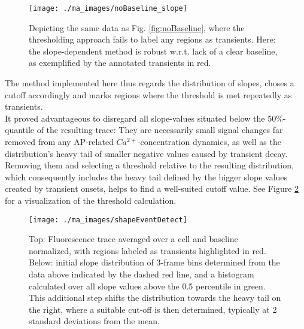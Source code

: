 \documentclass[titlepage]{article}
\begin{document}
\begin{figure}[h]
\centering
\texttt{[image: ./ma\_images/noBaseline\_slope]}
\caption{Depicting the same data as Fig. \ref{fig:noBaseline}, where the thresholding approach fails to label any regions as transients. Here: the slope-dependent method is robust w.r.t. lack of a clear baseline, as exemplified by the annotated transients in red.}
\label{fig:noBaseline_slope}
\end{figure}
The method implemented here thus regards the distribution of slopes, choses a cutoff accordingly and marks regions where the threshold is met repeatedly as transients.\\
It proved advantageous to disregard all slope-values situated below the 50\%-quantile of the resulting trace: They are necessarily small signal changes far removed from any AP-related $Ca^{2+}$-concentration dynamics, as well as the distribution's heavy tail of smaller negative values caused by transient decay.\\
Removing them and selecting a threshold relative to the resulting distribution, which consequently includes the heavy tail defined by the bigger slope values created by transient onsets, helps to find a well-suited cutoff value. See Figure \ref{fig:shapeEventDetect} for a visualization of the threshold calculation.
\begin{figure}[h]
\centering
\texttt{[image: ./ma\_images/shapeEventDetect]}
\caption{Top: Fluorescence trace averaged over a cell and baseline normalized, with regions labeled as transients highlighted in red. Below: initial slope distribution of 3-frame bins determined from the data above indicated by the dashed red line, and a histogram calculated over all slope values above the 0.5 percentile in green. This additional step shifts the distribution towards the heavy tail on the right, where a suitable cut-off is then determined, typically at 2 standard deviations from the mean.}
\label{fig:shapeEventDetect}
\end{figure}
\end{document}
